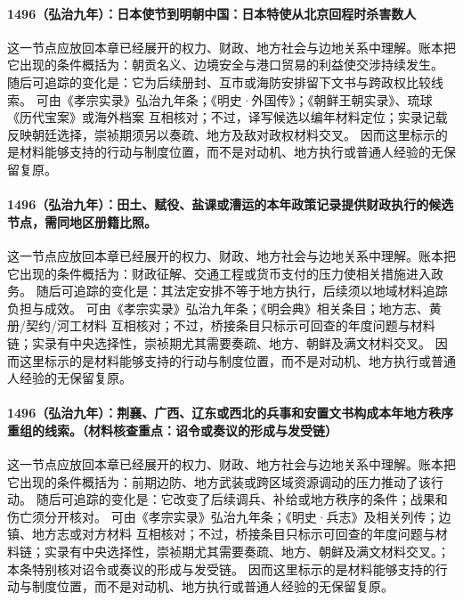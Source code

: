 \paragraph{1496（弘治九年）：日本使节到明朝中国：日本特使从北京回程时杀害数人} 这一节点应放回本章已经展开的权力、财政、地方社会与边地关系中理解。账本把它出现的条件概括为：朝贡名义、边境安全与港口贸易的利益使交涉持续发生。 随后可追踪的变化是：它为后续册封、互市或海防安排留下文书与跨政权比较线索。 可由《孝宗实录》弘治九年条；《明史·外国传》；《朝鲜王朝实录》、琉球《历代宝案》或海外档案 互相核对；不过，译写候选以编年材料定位；实录记载反映朝廷选择，崇祯期须另以奏疏、地方及敌对政权材料交叉。 因而这里标示的是材料能够支持的行动与制度位置，而不是对动机、地方执行或普通人经验的无保留复原。

\paragraph{1496（弘治九年）：田土、赋役、盐课或漕运的本年政策记录提供财政执行的候选节点，需同地区册籍比照。} 这一节点应放回本章已经展开的权力、财政、地方社会与边地关系中理解。账本把它出现的条件概括为：财政征解、交通工程或货币支付的压力使相关措施进入政务。 随后可追踪的变化是：其法定安排不等于地方执行，后续须以地域材料追踪负担与成效。 可由《孝宗实录》弘治九年条；《明会典》相关条目；地方志、黄册/契约/河工材料 互相核对；不过，桥接条目只标示可回查的年度问题与材料链；实录有中央选择性，崇祯期尤其需要奏疏、地方、朝鲜及满文材料交叉。 因而这里标示的是材料能够支持的行动与制度位置，而不是对动机、地方执行或普通人经验的无保留复原。

\paragraph{1496（弘治九年）：荆襄、广西、辽东或西北的兵事和安置文书构成本年地方秩序重组的线索。（材料核查重点：诏令或奏议的形成与发受链）} 这一节点应放回本章已经展开的权力、财政、地方社会与边地关系中理解。账本把它出现的条件概括为：前期边防、地方武装或跨区域资源调动的压力推动了该行动。 随后可追踪的变化是：它改变了后续调兵、补给或地方秩序的条件；战果和伤亡须分开核对。 可由《孝宗实录》弘治九年条；《明史·兵志》及相关列传；边镇、地方志或对方材料 互相核对；不过，桥接条目只标示可回查的年度问题与材料链；实录有中央选择性，崇祯期尤其需要奏疏、地方、朝鲜及满文材料交叉。；本条特别核对诏令或奏议的形成与发受链。 因而这里标示的是材料能够支持的行动与制度位置，而不是对动机、地方执行或普通人经验的无保留复原。

